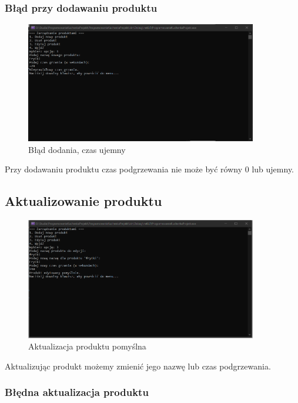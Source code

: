\subsubsection{Błąd przy dodawaniu produktu}
\begin{figure}[h]
    \centering
    \includegraphics[width=0.9\textwidth]{Menu8.png}
      \caption{Błąd dodania, czas ujemny}
    \label{fig:example}
\end{figure}

Przy dodawaniu produktu czas podgrzewania nie może być równy 0 lub ujemny.

\newpage

\subsection{Aktualizowanie produktu}

\begin{figure}[h]
    \centering
    \includegraphics[width=0.9\textwidth]{Menu9.png}
      \caption{Aktualizacja produktu pomyślna}
    \label{fig:example}
\end{figure}

Aktualizując produkt możemy zmienić jego nazwę lub czas podgrzewania.

\subsubsection{Błędna aktualizacja produktu}

